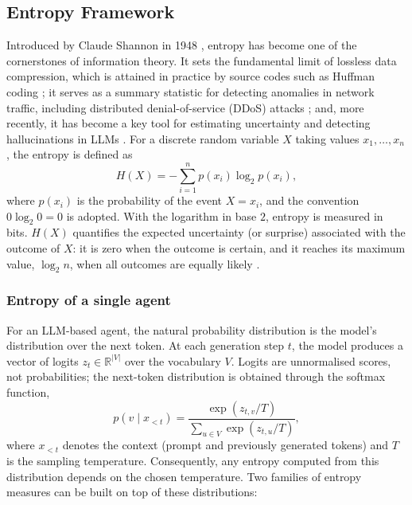 \subsection{Entropy Framework}

Introduced by Claude Shannon in 1948 \parencite{shannon1948mathematical}, entropy has become one of the cornerstones of information theory. It sets the fundamental limit of lossless data compression, which is attained in practice by source codes such as Huffman coding \parencite{shannon_encoding}; it serves as a summary statistic for detecting anomalies in network traffic, including distributed denial-of-service (DDoS) attacks \parencite{shannon_ddos}; and, more recently, it has become a key tool for estimating uncertainty and detecting hallucinations in LLMs \parencite{kuhn2023semantic, shannon_hallucination}. For a discrete random variable $X$ taking values $x_1, \ldots, x_n$, the entropy is defined as
\begin{equation}
  H(X) = - \sum_{i=1}^{n} p(x_i) \log_2 p(x_i),
  \label{eq:shanon_entropy}
\end{equation}
where $p(x_i)$ is the probability of the event $X = x_i$, and the convention $0 \log_2 0 = 0$ is adopted. With the logarithm in base $2$, entropy is measured in bits. $H(X)$ quantifies the expected uncertainty (or surprise) associated with the outcome of $X$: it is zero when the outcome is certain, and it reaches its maximum value, $\log_2 n$, when all outcomes are equally likely \parencite{cover2006elements}.

\subsubsection{Entropy of a single agent}

For an LLM-based agent, the natural probability distribution is the model's distribution over the next token. At each generation step $t$, the model produces a vector of logits $z_t \in \mathbb{R}^{|V|}$ over the vocabulary $V$. Logits are unnormalised scores, not probabilities; the next-token distribution is obtained through the softmax function,
\begin{equation}
  p(v \mid x_{<t}) = \frac{\exp\left(z_{t,v} / T\right)}{\sum_{u \in V} \exp\left(z_{t,u} / T\right)},
  \label{eq:softmax}
\end{equation}
where $x_{<t}$ denotes the context (prompt and previously generated tokens) and $T$ is the sampling temperature. Consequently, any entropy computed from this distribution depends on the chosen temperature. Two families of entropy measures can be built on top of these distributions:

